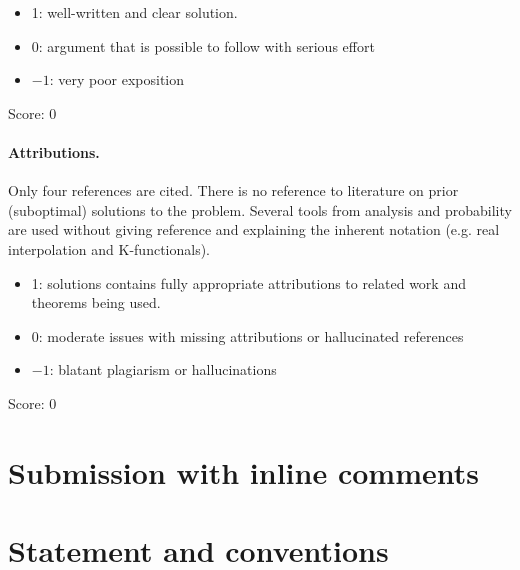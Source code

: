\documentclass[11pt]{article}
\theoremstyle{remark}
\begin{document}
\begin{itemize}
	\item  1: well-written and clear solution.
	\item  0: argument that is possible to follow with serious effort
	\item  $-1$: very poor exposition
\end{itemize}

\noindent Score: 0

\paragraph{Attributions.}

Only four references are cited. There is no reference to literature on prior (suboptimal) solutions to the problem. Several tools from analysis and probability are used without giving reference and explaining the inherent notation (e.g. real interpolation and K-functionals). 

\begin{itemize}
	\item  1: solutions contains fully appropriate attributions
		to related work and theorems being used.
	\item  0: moderate issues with missing attributions or hallucinated references
	\item  $-1$: blatant plagiarism or hallucinations
\end{itemize}

\noindent Score: 0

\newpage
\section{Submission with inline comments}


\begin{abstract}
For a sufficiently small, fixed H\"older--Zygmund ball of conductivities
around the constant function \(1\), the minimax squared \(L^2\)-risk is,
up to logarithmic factors,
\[
n^{-2\alpha/(2\alpha+d+3)}.
\]
We prove matching polynomial upper and lower bounds for every \(d\geq2\)
and \(\alpha>1\). The upper bound uses a regularized reconstruction along
gradient trajectories, together with a variance estimate that exploits
integration along these trajectories. The lower bound uses perturbations
that oscillate in the \(d-1\) angular directions. No boundary condition
on the conductivity is imposed.
\end{abstract}

\section{Statement and conventions}
\end{document}
